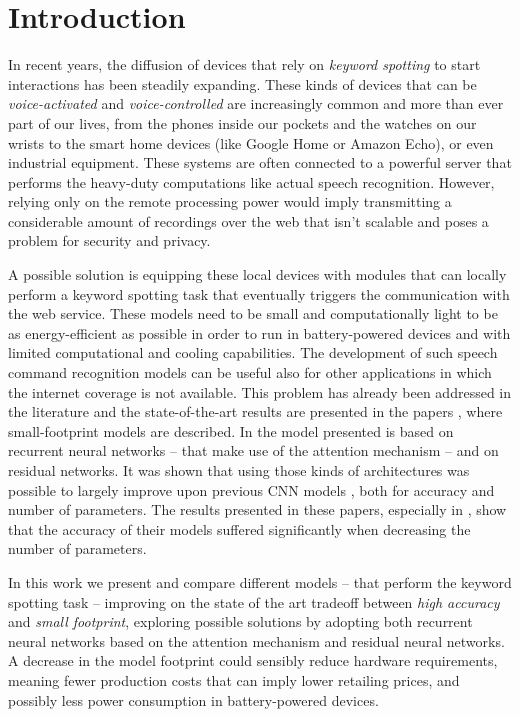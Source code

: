 
\section{Introduction}
\label{sec:introduction}

In recent years, the diffusion of devices that rely on \textit{keyword spotting} to start interactions has been steadily expanding. These kinds of devices that can be \textit{voice-activated} and \textit{voice-controlled} are increasingly common and more than ever part of our lives, from the phones inside our pockets and the watches on our wrists to the smart home devices (like Google Home or Amazon Echo), or even industrial equipment.
These systems are often connected to a powerful server that performs the heavy-duty computations like actual speech recognition. However, relying only on the remote processing power would imply transmitting a considerable amount of recordings over the web that isn't scalable and poses a problem for security and privacy.


A possible solution is equipping these local devices with modules that can locally perform a keyword spotting task that eventually triggers the communication with the web service.
These models need to be small and computationally light to be as energy-efficient as possible in order to run in battery-powered devices and with limited computational and cooling capabilities.
The development of such speech command recognition models can be useful also for other applications in which the internet coverage is not available.
This problem has already been addressed in the literature and the state-of-the-art results are presented in the papers \cite{1} \cite{2}, where small-footprint models are described. In \cite{1} the model presented is based on recurrent neural networks -- that make use of the attention mechanism -- and on residual networks. It was shown that using those kinds of architectures was possible to largely improve upon previous CNN models \cite{3}, both for accuracy and number of parameters. The results presented in these papers, especially in \cite{2}, show that the accuracy of their models suffered significantly when decreasing the number of parameters.


In this work we present and compare different models -- that perform the keyword spotting task -- improving on the state of the art tradeoff between \textit{high accuracy} and \textit{small footprint}, exploring possible solutions by adopting both recurrent neural networks based on the attention mechanism and residual neural networks. A decrease in the model footprint could sensibly reduce hardware requirements, meaning fewer production costs that can imply lower retailing prices, and possibly less power consumption in battery-powered devices.


